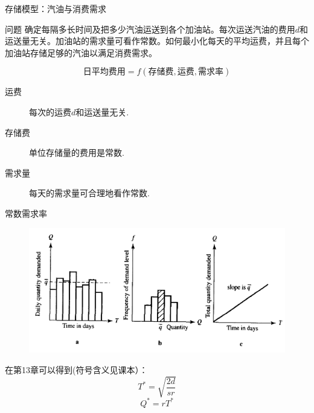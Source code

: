 \documentclass[UTF8]{ctexbeamer}
\begin{document}
\begin{frame}{存储模型：汽油与消费需求}
  \begin{block}{问题}
    确定每隔多长时间及把多少汽油运送到各个加油站。每次运送汽油的费用$d$和运送量无关。加油站的需求量可看作常数。如何最小化每天的平均运费，并且每个加油站存储足够的汽油以满足消费需求。
  \end{block}
  \[
  \text{日平均费用} = f(\text{存储费}, \text{运费}, \text{需求率})
  \]
  \begin{description}
  \item[运费] 每次的运费$d$和运送量无关.
  \item[存储费] 单位存储量的费用是常数.
  \item[需求量] 每天的需求量可合理地看作常数.
  \end{description}

\end{frame}

\begin{frame}{常数需求率}
  \begin{figure}
    \centering
    \includegraphics[width=.7\textwidth{}]{gas.png}
  \end{figure}

  在第13章可以得到(符号含义见课本）：
  \[
  T^* = \sqrt{\frac{2d}{sr}}
  \]
  \[
  Q^* = rT^*
  \]
\end{frame}
\end{document}
